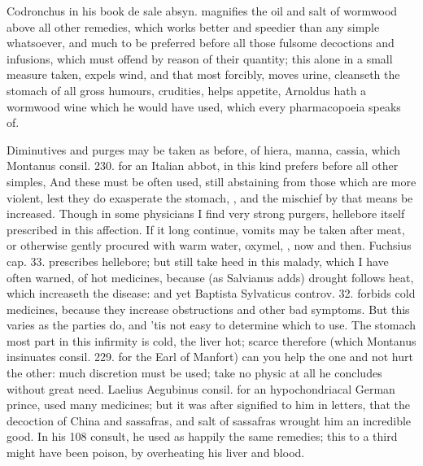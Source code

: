 Codronchus in his book \textlatin{de sale absyn.} magnifies the oil and salt of
wormwood above all other remedies, which works better and
speedier than any simple whatsoever, and much to be preferred before
all those fulsome decoctions and infusions, which must offend by reason
of their quantity; this alone in a small measure taken, expels wind,
and that most forcibly, moves urine, cleanseth the stomach of all gross
humours, crudities, helps appetite, \etc{} Arnoldus hath a wormwood wine
which he would have used, which every pharmacopoeia speaks of.

Diminutives and purges may be taken as before, of hiera, manna,
cassia, which Montanus consil. 230. for an Italian abbot, in this kind
prefers before all other simples, And these must be often used,
still abstaining from those which are more violent, lest they do
exasperate the stomach, \etc{}, and the mischief by that means be
increased. Though in some physicians I find very strong purgers,
hellebore itself prescribed in this affection. If it long continue,
vomits may be taken after meat, or otherwise gently procured with warm
water, oxymel, \etc{}, now and then. Fuchsius cap. 33. prescribes
hellebore; but still take heed in this malady, which I have often
warned, of hot medicines, because (as Salvianus adds) drought
follows heat, which increaseth the disease: and yet Baptista Sylvaticus
controv. 32. forbids cold medicines,  because they increase
obstructions and other bad symptoms. But this varies as the parties do,
and 'tis not easy to determine which to use. The stomach most
part in this infirmity is cold, the liver hot; scarce therefore (which
Montanus insinuates consil. 229. for the Earl of Manfort) can you help
the one and not hurt the other: much discretion must be used; take no
physic at all he concludes without great need. Laelius Aegubinus
consil. for an hypochondriacal German prince, used many medicines; but
it was after signified to him in letters, that the decoction of
China and sassafras, and salt of sassafras wrought him an incredible
good. In his 108 consult, he used as happily the same remedies; this to
a third might have been poison, by overheating his liver and blood.

